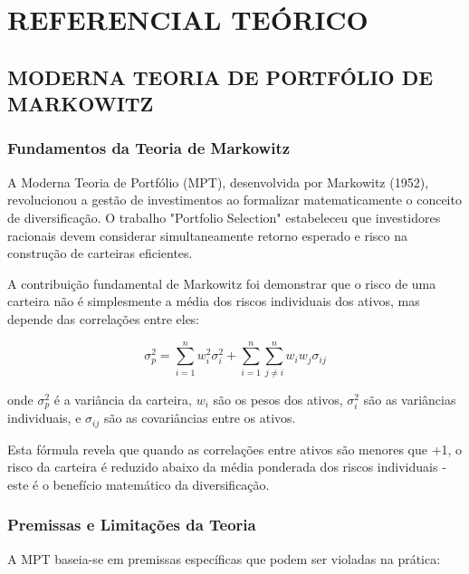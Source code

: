 
\chapter{REFERENCIAL TEÓRICO}

\section{MODERNA TEORIA DE PORTFÓLIO DE MARKOWITZ}

\subsection{Fundamentos da Teoria de Markowitz}

A Moderna Teoria de Portfólio (MPT), desenvolvida por Markowitz (1952), revolucionou a gestão de investimentos ao formalizar matematicamente o conceito de diversificação. O trabalho "Portfolio Selection" estabeleceu que investidores racionais devem considerar simultaneamente retorno esperado e risco na construção de carteiras eficientes.

A contribuição fundamental de Markowitz foi demonstrar que o risco de uma carteira não é simplesmente a média dos riscos individuais dos ativos, mas depende das correlações entre eles:

\begin{equation}
\sigma_p^2 = \sum_{i=1}^{n} w_i^2 \sigma_i^2 + \sum_{i=1}^{n} \sum_{j \neq i}^{n} w_i w_j \sigma_{ij}
\end{equation}

onde $\sigma_p^2$ é a variância da carteira, $w_i$ são os pesos dos ativos, $\sigma_i^2$ são as variâncias individuais, e $\sigma_{ij}$ são as covariâncias entre os ativos.

Esta fórmula revela que quando as correlações entre ativos são menores que +1, o risco da carteira é reduzido abaixo da média ponderada dos riscos individuais - este é o benefício matemático da diversificação.

\subsection{Premissas e Limitações da Teoria}

A MPT baseia-se em premissas específicas que podem ser violadas na prática:

